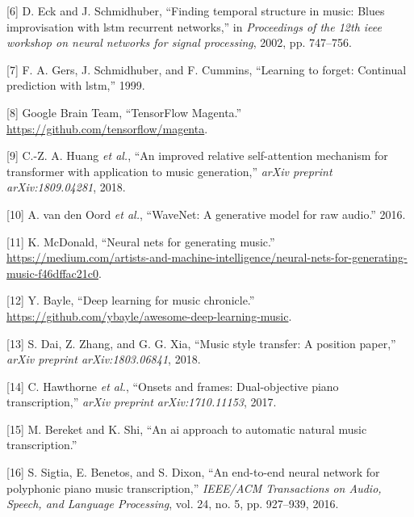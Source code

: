 \documentclass[12pt,]{article}
\begin{document}
\leavevmode\hypertarget{ref-eck2002finding}{}%
{[}6{]} D. Eck and J. Schmidhuber, ``Finding temporal structure in
music: Blues improvisation with lstm recurrent networks,'' in
\emph{Proceedings of the 12th ieee workshop on neural networks for
signal processing}, 2002, pp. 747--756.

\leavevmode\hypertarget{ref-gers1999learning}{}%
{[}7{]} F. A. Gers, J. Schmidhuber, and F. Cummins, ``Learning to
forget: Continual prediction with lstm,'' 1999.

\leavevmode\hypertarget{ref-magenta}{}%
{[}8{]} \relax Google Brain Team, ``TensorFlow Magenta.''
\url{https://github.com/tensorflow/magenta}.

\leavevmode\hypertarget{ref-huang2018improved}{}%
{[}9{]} C.-Z. A. Huang \emph{et al.}, ``An improved relative
self-attention mechanism for transformer with application to music
generation,'' \emph{arXiv preprint arXiv:1809.04281}, 2018.

\leavevmode\hypertarget{ref-oord2016wavenet}{}%
{[}10{]} A. van den Oord \emph{et al.}, ``WaveNet: A generative model
for raw audio.'' 2016.

\leavevmode\hypertarget{ref-mediumkylemcdonald}{}%
{[}11{]} K. McDonald, ``Neural nets for generating music.'' \\
\url{https://medium.com/artists-and-machine-intelligence/neural-nets-for-generating-music-f46dffac21c0}.

\leavevmode\hypertarget{ref-libdlmusic}{}%
{[}12{]} Y. Bayle, ``Deep learning for music chronicle.'' \\
\url{https://github.com/ybayle/awesome-deep-learning-music}.

\leavevmode\hypertarget{ref-dai2018music}{}%
{[}13{]} S. Dai, Z. Zhang, and G. G. Xia, ``Music style transfer: A
position paper,'' \emph{arXiv preprint arXiv:1803.06841}, 2018.

\leavevmode\hypertarget{ref-hawthorne2017onsets}{}%
{[}14{]} C. Hawthorne \emph{et al.}, ``Onsets and frames: Dual-objective
piano transcription,'' \emph{arXiv preprint arXiv:1710.11153}, 2017.

\leavevmode\hypertarget{ref-bereketai}{}%
{[}15{]} M. Bereket and K. Shi, ``An ai approach to automatic natural
music transcription.''

\leavevmode\hypertarget{ref-sigtia2016end}{}%
{[}16{]} S. Sigtia, E. Benetos, and S. Dixon, ``An end-to-end neural
network for polyphonic piano music transcription,'' \emph{IEEE/ACM
Transactions on Audio, Speech, and Language Processing}, vol. 24, no. 5,
pp. 927--939, 2016.
\end{document}
